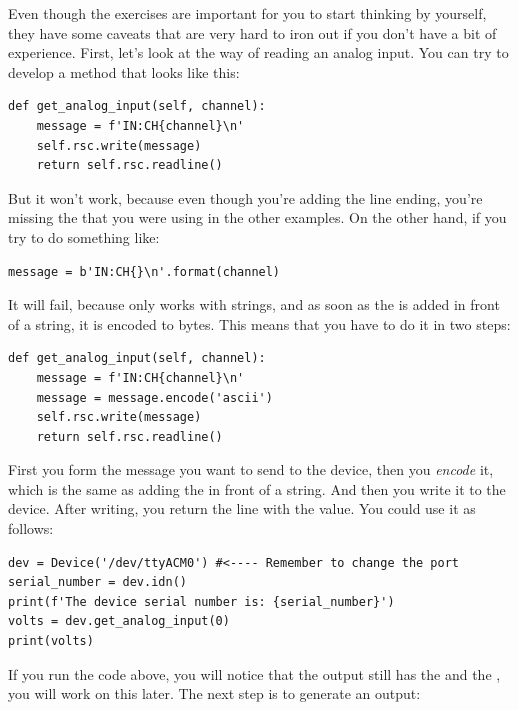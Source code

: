 
Even though the exercises are important for you to start thinking by yourself, they have some caveats that are very hard to iron out if you don't have a bit of experience. First, let's look at the way of reading an analog input. You can try to develop a method that looks like this:

\begin{verbatim}
def get_analog_input(self, channel):
    message = f'IN:CH{channel}\n'
    self.rsc.write(message)
    return self.rsc.readline()
\end{verbatim}

But it won't work, because even though you're adding the line ending, you're missing the  that you were using in the other examples. On the other hand, if you try to do something like:

\begin{verbatim}
message = b'IN:CH{}\n'.format(channel)
\end{verbatim}

It will fail, because  only works with strings, and as soon as the  is added in front of a string, it is encoded to bytes. This means that you have to do it in two steps:

\begin{verbatim}
def get_analog_input(self, channel):
    message = f'IN:CH{channel}\n'
    message = message.encode('ascii')
    self.rsc.write(message)
    return self.rsc.readline()
\end{verbatim}

First you form the message you want to send to the device, then you \emph{encode} it, which is the same as adding the  in front of a string. And then you write it to the device. After writing, you return the line with the value. You could use it as follows:

\begin{verbatim}
dev = Device('/dev/ttyACM0') #<---- Remember to change the port
serial_number = dev.idn()
print(f'The device serial number is: {serial_number}')
volts = dev.get_analog_input(0)
print(volts)
\end{verbatim}

If you run the code above, you will notice that the output still has the  and the \py{\n}, you will work on this later. The next step is to generate an output:

